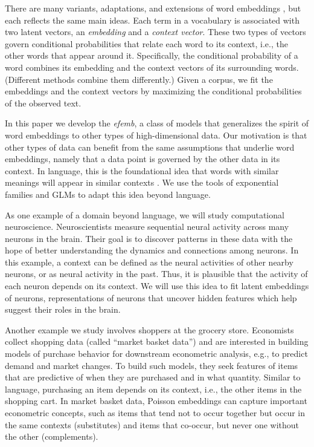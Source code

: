 \documentclass[12pt]{article}
\begin{document}
There are many variants, adaptations, and extensions of word
embeddings
\citep{mikolov2013efficient,mikolov2013distributed,mnih2013learning,levy2014neural,pennington2014glove,vilnis2014word},
but each reflects the same main ideas.  Each term in a vocabulary is
associated with two latent vectors, an \textit{embedding} and a
\textit{context vector}.  These two types of vectors govern
conditional probabilities that relate each word to its context, i.e.,
the other words that appear around it. Specifically, the conditional
probability of a word combines its embedding and the context vectors
of its surrounding words.  (Different methods combine them
differently.)  Given a corpus, we fit the embeddings and the context
vectors by maximizing the conditional probabilities of the observed
text.

In this paper we develop the \textit{\gls{efemb}}, a class of models
that generalizes the spirit of word embeddings to other types of
high-dimensional data. Our motivation is that other types of data can
benefit from the same assumptions that underlie word embeddings,
namely that a data point is governed by the other data in its
context. In language, this is the foundational idea that words with
similar meanings will appear in similar contexts
\citep{harris1954distributional}. We use the tools of exponential
families \citep{brown1986fundamentals} and \glspl{GLM}
\citep{mccullagh1989generalized} to adapt this idea beyond language.

As one example of a domain beyond language, we will study
computational neuroscience. Neuroscientists measure sequential neural
activity across many neurons in the brain. Their goal is to discover
patterns in these data with the hope of better understanding the
dynamics and connections among neurons.  In this example, a context
can be defined as the neural activities of other nearby neurons, or as
neural activity in the past.  Thus, it is plausible that the activity
of each neuron depends on its context.  We will use this idea to fit
latent embeddings of neurons, representations of neurons that uncover
hidden features which help suggest their roles in the brain.

Another example we study involves shoppers at the grocery store.
Economists collect shopping data (called ``market basket data'') and
are interested in building models of purchase behavior for downstream
econometric analysis, e.g., to predict demand and market changes. To
build such models, they seek features of items that are predictive of
when they are purchased and in what quantity. Similar to language,
purchasing an item depends on its context, i.e., the other items in
the shopping cart. In market basket data, Poisson embeddings can
capture important econometric concepts, such as items that tend not to
occur together but occur in the same contexts (substitutes) and items
that co-occur, but never one without the other (complements).
\end{document}
